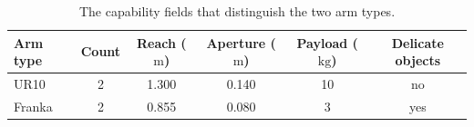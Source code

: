 \begin{table}[H]
\centering
\caption{The capability fields that distinguish the two arm types.}
\label{tab:system:arms}
\begin{tabular}{lccccc}
\toprule
Arm type & Count & Reach ($\mathrm{m}$) & Aperture ($\mathrm{m}$) & Payload ($\mathrm{kg}$) & Delicate objects \\
\midrule
UR10 & 2 & 1.300 & 0.140 & 10 & no \\
Franka & 2 & 0.855 & 0.080 & 3 & yes \\
\bottomrule
\end{tabular}
\end{table}
